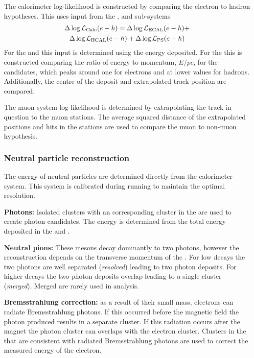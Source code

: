 The calorimeter log-likelihood is constructed by comparing the electron to hadron hypotheses. This uses input from the \ecal, \hcal and \presh sub-systems
\begin{multline}
\Delta \log{\mathcal{L}_\text{Calo}}(e - h) =  \Delta \log{\mathcal{L}_\text{ECAL}}(e - h) + \\
 \Delta \log{\mathcal{L}_\text{HCAL}}(e - h) + \Delta \log{\mathcal{L}_\text{PS}}(e - h)
\end{multline}
For the \hcal and \presh this input is determined using the energy deposited. For the \ecal this is constructed comparing the ratio of energy to momentum, $E/pc$, for the candidates, which peaks around one for electrons and at lower values for hadrons. Additionally, the centre of the \ecal deposit and extrapolated track position are compared.     

The muon system log-likelihood is determined by extrapolating the track in question to the muon stations. The average squared distance of the extrapolated positions and hits in the stations are used to compare the muon to non-muon hypothesis.   

\subsubsection{Neutral particle reconstruction}

The energy of neutral particles are determined directly from the calorimeter system. This system is calibrated during running to maintain the optimal resolution.  

\begin{description}
\item\textbf{Photons:} Isolated \ecal clusters with an corresponding cluster in the \presh are used to create photon candidates. The energy is determined from the total energy deposited in the \ecal and \presh. 
\item \textbf{Neutral pions:} These mesons decay dominantly to two photons, however the reconstruction depends on the transverse momentum of the \piz. For low \pt decays the two photons are well separated (\emph{resolved}) leading to two photon deposits. For higher \pt decays the two photon deposits overlap leading to a single \ecal cluster (\emph{merged}). Merged \piz are rarely used in analysis.
\item \textbf{Bremsstrahlung correction:} as a result of their small mass, electrons can radiate Bremsstrahlung photons. If this occurred before the magnetic field the photon produced results in a separate \ecal cluster. If this radiation occurs after the magnet the photon cluster can overlaps with the electron cluster. Clusters in the \ecal that are consistent with radiated Bremsstrahlung photons are used to correct the measured energy of the electron.
\end{description}



